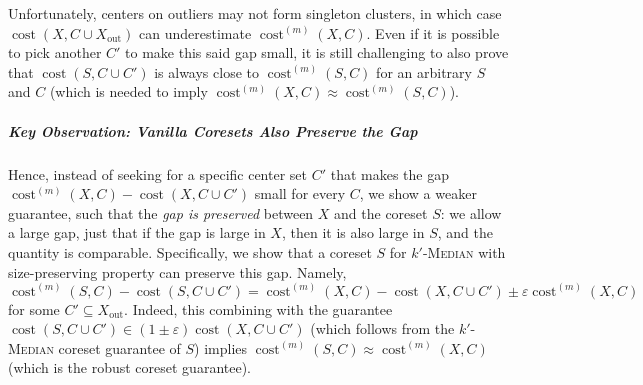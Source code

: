 \documentclass[letterpaper,11pt]{article}
\theoremstyle{plain}
\theoremstyle{definition}
\theoremstyle{remark}
\DeclareMathOperator{\cost}{cost}
\newcommand{\out}{\mathrm{out}}
\newcommand{\eps}{\varepsilon}
\renewcommand{\epsilon}{\varepsilon}
\begin{document}
Unfortunately, centers on outliers may not form singleton clusters, in which case $\cost(X, C \cup X_{\out})$ can underestimate $\cost^{(m)}(X, C)$. 
Even if it is possible to pick another $C'$ to make this said gap small,
it is still challenging to also prove that $\cost(S,C\cup C')$ is always close to $\cost^{(m)}(S,C)$ for an arbitrary $S$ and $C$
(which is needed to imply $\cost^{(m)}(X,C)\approx \cost^{(m)}(S,C)$).

\subparagraph{Key Observation: Vanilla Coresets Also Preserve the Gap}
Hence, instead of seeking for a specific center set $C'$ that makes the gap $\cost^{(m)}(X, C) - \cost(X, C \cup C')$ small for every $C$,
we show a weaker guarantee, such that the \emph{gap is preserved} between $X$ and the coreset $S$:
we allow a large gap, just that if the gap is large in $X$, then it is also large in $S$, and the quantity is comparable.
Specifically, we show that a coreset $S$ for $k'$-\textsc{Median} with size-preserving property can preserve this gap.
Namely,
\begin{equation}
    \label{eqn:gap_preserve}
    \cost^{(m)}(S, C) - \cost(S, C \cup C') = \cost^{(m)}(X, C) - \cost(X, C \cup C') \pm \epsilon \cost^{(m)}(X, C)
\end{equation}
for some $C'\subseteq X_\out$.
Indeed, this combining with the guarantee $\cost(S, C \cup C') \in (1 \pm \eps) \cost(X, C \cup C')$ (which follows from the $k'$-\textsc{Median} coreset guarantee of $S$) 
implies $\cost^{(m)}(S, C) \approx \cost^{(m)}(X, C)$ (which is the robust coreset guarantee).
\end{document}
